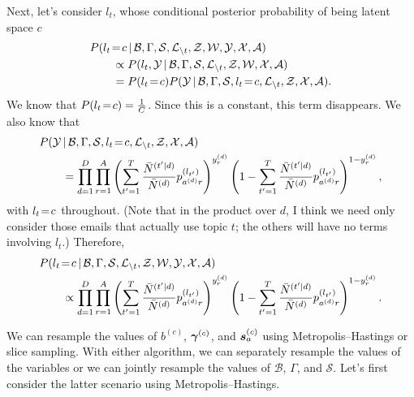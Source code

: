 \documentclass[10pt,english,oneside]{article}
\begin{document}
Next, let's consider $l_t$, whose conditional posterior probability
of being latent space $c$
\begin{align}
  &P(l_t \!=\! c \,|\, \mathcal{B}, \Gamma, \mathcal{S},
  \mathcal{L}_{\setminus t}, \mathcal{Z}, \mathcal{W}, \mathcal{Y},
  \mathcal{X}, \mathcal{A}) \notag \\
  &\qquad \propto P(l_t, \mathcal{Y} \,|\, \mathcal{B},
  \Gamma, \mathcal{S},
  \mathcal{L}_{\setminus t}, \mathcal{Z}, \mathcal{W},
  \mathcal{X}, \mathcal{A})\\
  &\qquad = P(l_t \!=\! c) P(\mathcal{Y} \,|\, \mathcal{B}, \Gamma,
  \mathcal{S}, l_t \!=\! c, \mathcal{L}_{\setminus t}, \mathcal{Z},
  \mathcal{X}, \mathcal{A}).
\end{align}
We know that $P(l_t \!=\! c) = \frac{1}{C}$. Since this is a constant,
this term disappears. We also know that
\begin{align}
  &P(\mathcal{Y} \,|\, \mathcal{B}, \Gamma, \mathcal{S}, l_t \!=\! c,
  \mathcal{L}_{\setminus t}, \mathcal{Z}, \mathcal{X}, \mathcal{A})
  \notag \\
  &\qquad =
  \prod_{d=1}^D \prod_{r=1}^A
  \left(   \sum_{t'=1}^T \frac{\bar{N}^{(t'|d)}}{\bar{N}^{(d)}} p_{a^{(d)}r}^{(l_{t'})}
  \right)^{y^{(d)}_r} \left( 1 -   \sum_{t'=1}^T
  \frac{\bar{N}^{(t'|d)}}{\bar{N}^{(d)}} p_{a^{(d)}r}^{(l_{t'})}\right)^{1 - y^{(d)}_r},
\end{align}
with $l_t \!=\! c$ throughout. (Note that in the product over $d$, I
think we need only consider those emails that actually use topic $t$;
the others will have no terms involving $l_t$.)  Therefore,
\begin{align}
  &P(l_t \!=\! c \,|\, \mathcal{B}, \Gamma, \mathcal{S},
  \mathcal{L}_{\setminus t}, \mathcal{Z}, \mathcal{W}, \mathcal{Y},
  \mathcal{X}, \mathcal{A}) \notag\\
  &\qquad \propto \prod_{d=1}^D \prod_{r=1}^A
  \left(   \sum_{t'=1}^T \frac{\bar{N}^{(t'|d)}}{\bar{N}^{(d)}} p_{a^{(d)}r}^{(l_{t'})}
  \right)^{y^{(d)}_r} \left( 1 -   \sum_{t'=1}^T
  \frac{\bar{N}^{(t'|d)}}{\bar{N}^{(d)}} p_{a^{(d)}r}^{(l_{t'})}\right)^{1 - y^{(d)}_r}.
\end{align}

We can resample the values of $b^{(c)}$, $\boldsymbol{\gamma}^{(c)}$, and
$\boldsymbol{s}^{(c)}_a$ using Metropolis--Hastings or slice sampling. With
either algorithm, we can separately resample the values of the
variables or we can jointly resample the values of $\mathcal{B}$,
$\Gamma$, and $\mathcal{S}$. Let's first consider the latter scenario
using Metropolis--Hastings.
\end{document}
